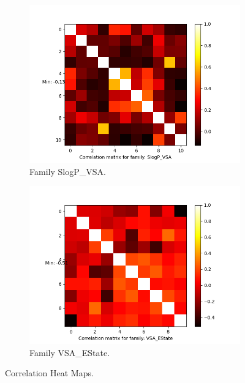 \documentclass[11pt]{article}
\begin{document}
\begin{figure}
      \hfill
     \begin{subfigure}[b]{0.45\textwidth}
         \centering
        \includegraphics[scale=0.5]{images/correlationSlogPVSA}
        \caption{Family SlogP\_VSA.}
        \label{fig:correlationSlogPVSA}
     \end{subfigure}
             \hfill
     \begin{subfigure}[b]{0.45\textwidth}
         \centering
        \includegraphics[scale=0.5]{images/correlationVSAEState}
        \caption{Family VSA\_EState.}
        \label{fig:correlationVSAEState}
     \end{subfigure}     
     \caption{Correlation Heat Maps.}
     \label{fig:CorrHeatMapFig}
\end{figure}
\end{document}
